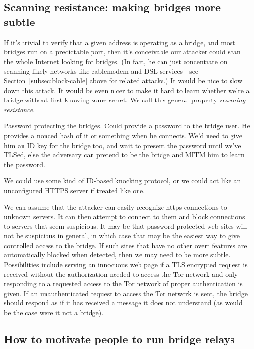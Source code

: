 \documentclass{llncs}
\begin{document}
\subsection{Scanning resistance: making bridges more subtle}

If it's trivial to verify that a given address is operating as a bridge,
and most bridges run on a predictable port, then it's conceivable our
attacker could scan the whole Internet looking for bridges. (In fact, he
can just concentrate on scanning likely networks like cablemodem and DSL
services---see Section~\ref{subsec:block-cable} above for related attacks.) It
would be nice to slow down this attack. It would be even nicer to make
it hard to learn whether we're a bridge without first knowing some
secret. We call this general property \emph{scanning resistance}.

Password protecting the bridges.
Could provide a password to the bridge user. He provides a nonced hash of
it or something when he connects. We'd need to give him an ID key for the
bridge too, and wait to present the password until we've TLSed, else the
adversary can pretend to be the bridge and MITM him to learn the password.

We could use some kind of ID-based knocking protocol, or we could act like an
unconfigured HTTPS server if treated like one.

We can assume that the attacker can easily recognize https connections
to unknown servers. It can then attempt to connect to them and block
connections to servers that seem suspicious. It may be that password
protected web sites will not be suspicious in general, in which case
that may be the easiest way to give controlled access to the bridge.
If such sites that have no other overt features are automatically
blocked when detected, then we may need to be more subtle.
Possibilities include serving an innocuous web page if a TLS encrypted
request is received without the authorization needed to access the Tor
network and only responding to a requested access to the Tor network
of proper authentication is given. If an unauthenticated request to
access the Tor network is sent, the bridge should respond as if
it has received a message it does not understand (as would be the
case were it not a bridge).


\subsection{How to motivate people to run bridge relays}
\label{subsec:incentives}
\end{document}
